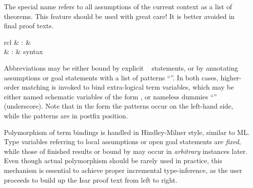 \begin{isabellebody}
\begin{isamarkuptext}
  The special name \hyperlink{fact.prems}{\mbox{}} refers to all assumptions of the
  current context as a list of theorems.  This feature should be used
  with great care!  It is better avoided in final proof texts.%
\end{isamarkuptext}%
\isamarkuptrue%
%
\isamarkuptrue%
%
\begin{isamarkuptext}%
\begin{matharray}{rcl}
    \hypertarget{command.let}{\hyperlink{command.let}{\mbox{}}} & : &  \\
    \hypertarget{keyword.is}{\hyperlink{keyword.is}{\mbox{}}} & : & syntax \\
  \end{matharray}

  Abbreviations may be either bound by explicit \hyperlink{command.let}{\mbox{}}~ statements, or by annotating assumptions or
  goal statements with a list of patterns ``''.  In both cases, higher-order matching is invoked to
  bind extra-logical term variables, which may be either named
  schematic variables of the form , or nameless dummies
  ``\hyperlink{variable.underscore}{\mbox{\isa{{\isacharunderscore}}}}'' (underscore). Note that in the \hyperlink{command.let}{\mbox{}}
  form the patterns occur on the left-hand side, while the \hyperlink{keyword.is}{\mbox{}} patterns are in postfix position.

  Polymorphism of term bindings is handled in Hindley-Milner style,
  similar to ML.  Type variables referring to local assumptions or
  open goal statements are \emph{fixed}, while those of finished
  results or bound by \hyperlink{command.let}{\mbox{}} may occur in \emph{arbitrary}
  instances later.  Even though actual polymorphism should be rarely
  used in practice, this mechanism is essential to achieve proper
  incremental type-inference, as the user proceeds to build up the
  Isar proof text from left to right.


\end{isamarkuptext}
\end{isabellebody}
